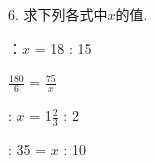 6.	求下列各式中$x$的值. 

\begin{subquestions}

      ：$x$ = 18 : 15 \hspace{3cm}

     \subquestion $\frac{180}{6}$ = $\frac{75}{x}$ 

      : $x$ = 1$\frac{2}{3}$ : 2 \hspace{3.4cm} 

      : 35 = $x$ : 10

\end{subquestions}





